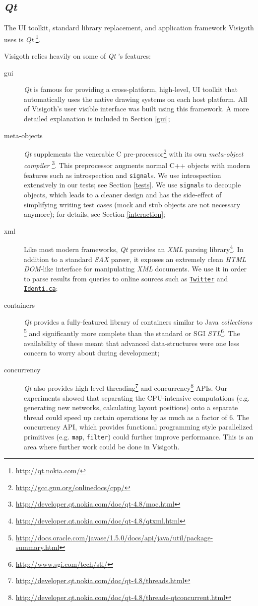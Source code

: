 \documentclass[a4paper,11pt,titlepage]{article}
\let\stdhref\href
\renewcommand{\href}[2]{\stdhref{#1}{\texttt{#2}}}
\newcommand{\code}[1]{\texttt{#1}}
\newcommand{\buzz}[1]{\emph{#1}}
\newcommand{\Qt}{\buzz{Qt} }
\begin{document}
\subsection{\Qt}

The UI toolkit, standard library replacement, and application
framework Visigoth uses is \Qt \footnote{\url{http://qt.nokia.com/}}.

Visigoth relies heavily on some of \Qt's features:
\begin{description}
\item [gui] \Qt is famous for providing a cross-platform, high-level,
  UI toolkit that automatically uses the native drawing systems on
  each host platform. All of Visigoth's user visible interface was
  built using this framework. A more detailed explanation is included
  in Section \ref{gui};
\item [meta-objects] \Qt supplements the venerable C
  pre-processor\footnote{\url{http://gcc.gnu.org/onlinedocs/cpp/}}
  with its own \buzz{meta-object
    compiler} \footnote{\url{http://developer.qt.nokia.com/doc/qt-4.8/moc.html}}.
  This preprocessor augments normal C++ objects with modern features
  such as introspection and \code{signal}s. We use introspection
  extensively in our tests; see Section \ref{tests}. We use
  \code{signal}s to decouple objects, which leads to a cleaner design
  and has the side-effect of simplifying writing test cases (mock and
  stub objects are not necessary anymore); for details, see Section
  \ref{interaction};
\item [xml] Like most modern frameworks, \Qt provides an \buzz{XML}
  parsing
  library\footnote{\url{http://developer.qt.nokia.com/doc/qt-4.8/qtxml.html}}.
  In addition to a standard \buzz{SAX} parser, it exposes an extremely
  clean \buzz{HTML DOM}-like interface for manipulating \buzz{XML}
  documents. We use it in order to parse results from queries to
  online sources such as \href{http://twitter.com}{Twitter} and
  \href{http://identi.ca}{Identi.ca};
\item [containers] \Qt provides a fully-featured library of containers
  similar to Java
  \buzz{collections} \footnote{\url{http://docs.oracle.com/javase/1.5.0/docs/api/java/util/package-summary.html}}
  and significantly more complete than the standard or SGI
  \buzz{STL}\footnote{\url{http://www.sgi.com/tech/stl/}}. The
  availability of these meant that advanced data-structures were one
  less concern to worry about during development;
\item [concurrency] \Qt also provides high-level
  threading\footnote{\url{http://developer.qt.nokia.com/doc/qt-4.8/threads.html}}
  and
  concurrency\footnote{\url{http://developer.qt.nokia.com/doc/qt-4.8/threads-qtconcurrent.html}}
  APIs. Our experiments showed that separating the CPU-intensive
  computations (e.g. generating new networks, calculating layout
  positions) onto a separate thread could speed up certain operations
  by as much as a factor of $6$. The concurrency API, which provides
  functional programming style parallelized primitives
  (e.g. \code{map}, \code{filter}) could further improve performance.
  This is an area where further work could be done in Visigoth.
\end{description}
\end{document}
